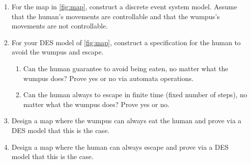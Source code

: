 \documentclass[12pt,letterpaper]{ntdhw}
\begin{document}
\begin{enumerate}

  \item For the map in \autoref{fig:map}, construct a discrete event
  system model.  Assume that the human's movements are controllable
  and that the wumpus's movements are not controllable.

  \item For your DES model of \autoref{fig:map}, construct a specification
  for the human to avoid the wumpus and escape.
  \begin{enumerate}
    \item Can the human guarantee to avoid being eaten, no matter what
    the wumpus does?  Prove yes or no via automata operations.
    \item Can the human always to escape in finite time (fixed
    number of steps), no matter what the wumpus does?  Prove yes or
    no.
  \end{enumerate}

  \item Design a map where the wumpus can always eat the human and
  prove via a DES model that this is the case.

  \item Design a map where the human can always escape and prove via a
  DES model that this is the case.

\end{enumerate}
\end{document}
